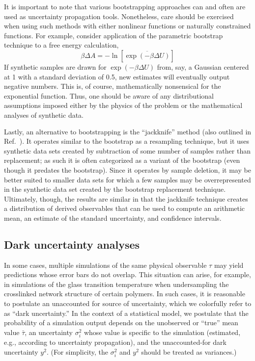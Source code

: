 It is important to note that various bootstrapping approaches can and often are used as uncertainty propagation tools.  Nonetheless, care should be exercised when using such methods with either nonlinear functions or naturally constrained functions.  For example, consider application of the parametric bootstrap technique to a free energy calculation,
%
\begin{equation}
  \beta \Delta A = - \ln \left[ \overline{\exp\left(-\beta \Delta U\right)} \right]
\end{equation}
%
If synthetic samples are drawn for $\exp(-\beta \Delta U)$ from, say, a Gaussian centered at 1 with a standard deviation of 0.5, new estimates will eventually output negative numbers. This is, of course, mathematically nonsensical for the exponential function.  Thus, one should be aware of any distributional assumptions imposed either by the physics of the problem or the mathematical analyses of synthetic data.

Lastly, an alternative to bootstrapping is the ``jackknife'' method \cite{Quenouille_Approximate_1949,Quenouille_Notes_1956,Tukey_Bias_1958} (also outlined in Ref.~\cite{Tibshirani1998}). It operates similar to the bootstrap as a resampling technique, but it uses synthetic data sets created by subtraction of some number of samples rather than replacement; as such it is often categorized as a variant of the bootstrap (even though it predates the bootstrap). Since it operates by sample deletion, it may be better suited to smaller data sets for which a few samples may be overrepresented in the synthetic data set created by the bootstrap replacement technique. Ultimately, though, the results are similar in that the jackknife technique creates a distribution of derived observables that can be used to compute an arithmetic mean, an estimate of the standard uncertainty, and confidence intervals.

\subsection{Dark uncertainty analyses}

In some cases, multiple simulations of the same physical observable $\tau$ may yield predictions whose error bars do not overlap.  This situation can arise, for example, in simulations of the glass transition temperature when undersampling the crosslinked network structure of certain polymers.  In such cases, it is reasonable to postulate an unaccounted for source of uncertainty, which we colorfully refer to as ``dark uncertainty.''\cite{patrone1}  In the context of a statistical model, we postulate that the probability of a simulation output depends on the unobserved or ``true'' mean value $\bar \tau$, an uncertainty $\sigma_i^2$ whose value is specific to the simulation (estimated, e.g., according to uncertainty propagation), and the unaccounted-for dark uncertainty $y^2$.  (For simplicity, the $\sigma_i^2$ and $y^2$ should be treated as variances.)

